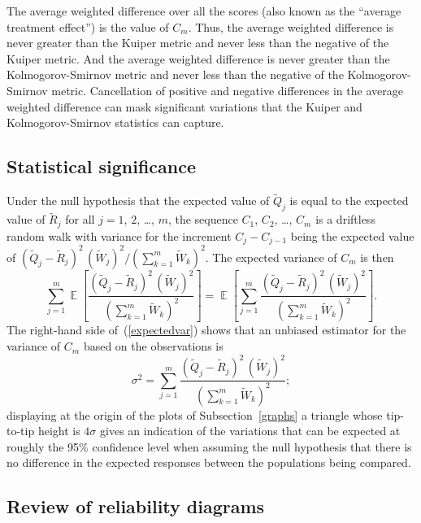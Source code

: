 \documentclass[]{fairmeta}
\DeclareMathOperator{\E}{\mathop{}\mathbb{E}}
\begin{document}
The average weighted difference over all the scores (also known as
the ``average treatment effect'') is the value of $C_m$. Thus,
the average weighted difference is never greater than the Kuiper metric
and never less than the negative of the Kuiper metric. And
the average weighted difference is never greater
than the Kolmogorov-Smirnov metric and never less than the negative
of the Kolmogorov-Smirnov metric.
Cancellation of positive and negative differences
in the average weighted difference can mask significant variations
that the Kuiper and Kolmogorov-Smirnov statistics can capture.


\subsection{Statistical significance}
\label{significance}

Under the null hypothesis that the expected value of $\tilde{Q}_j$
is equal to the expected value of $\tilde{R}_j$
for all $j = 1$, $2$, \dots, $m$,
the sequence $C_1$, $C_2$, \dots, $C_m$ is a driftless random walk
with variance for the increment $C_j - C_{j-1}$ being the expected value of
$(\tilde{Q}_j - \tilde{R}_j)^2 \, (\tilde{W}_j)^2
/(\sum_{k=1}^m \tilde{W}_k)^2$.
The expected variance of $C_m$ is then
%
\begin{equation}
\label{expectedvar}
\sum_{j=1}^m \E\left[
\frac{(\tilde{Q}_j - \tilde{R}_j)^2 \, (\tilde{W}_j)^2}
     {(\sum_{k=1}^m \tilde{W}_k)^2} \right]
= \E\left[ \sum_{j=1}^m
           \frac{(\tilde{Q}_j - \tilde{R}_j)^2 \, (\tilde{W}_j)^2}
                {(\sum_{k=1}^m \tilde{W}_k)^2} \right].
\end{equation}
%
The right-hand side of~(\ref{expectedvar}) shows that an unbiased estimator
for the variance of $C_m$ based on the observations is
%
\begin{equation}
\sigma^2 = \sum_{j=1}^m \frac{(\tilde{Q}_j - \tilde{R}_j)^2 \, (\tilde{W}_j)^2}
                             {(\sum_{k=1}^m \tilde{W}_k)^2};
\end{equation}
%
displaying at the origin of the plots of Subsection~\ref{graphs}
a triangle whose tip-to-tip height is $4\sigma$ gives
an indication of the variations that can be expected
at roughly the 95\% confidence level when assuming the null hypothesis
that there is no difference in the expected responses
between the populations being compared.


\subsection{Review of reliability diagrams}
\label{reliadia}
\end{document}
